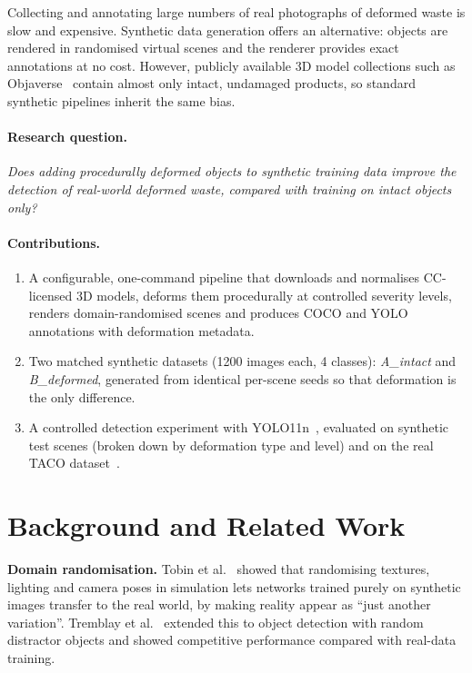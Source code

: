 \documentclass[11pt,a4paper]{article}
\begin{document}
Collecting and annotating large numbers of real photographs of deformed waste is slow and
expensive. Synthetic data generation offers an alternative: objects are rendered in randomised
virtual scenes and the renderer provides exact annotations at no cost. However, publicly
available 3D model collections such as Objaverse~\cite{objaverse} contain almost only intact,
undamaged products, so standard synthetic pipelines inherit the same bias.

\paragraph{Research question.} \emph{Does adding procedurally deformed objects to synthetic
training data improve the detection of real-world deformed waste, compared with training on
intact objects only?}

\paragraph{Contributions.}
\begin{enumerate}
  \item A configurable, one-command pipeline that downloads and normalises CC-licensed 3D models,
        deforms them procedurally at controlled severity levels, renders domain-randomised
        scenes and produces COCO and YOLO annotations with deformation metadata.
  \item Two matched synthetic datasets (1200 images each, 4 classes): \emph{A\_intact} and
        \emph{B\_deformed}, generated from identical per-scene seeds so that deformation is the
        only difference.
  \item A controlled detection experiment with YOLO11n~\cite{yolo11}, evaluated on synthetic test
        scenes (broken down by deformation type and level) and on the real TACO
        dataset~\cite{taco}.
\end{enumerate}

\section{Background and Related Work}

\textbf{Domain randomisation.} Tobin et al.~\cite{tobin} showed that randomising textures,
lighting and camera poses in simulation lets networks trained purely on synthetic images
transfer to the real world, by making reality appear as ``just another variation''. Tremblay
et al.~\cite{tremblay} extended this to object detection with random distractor objects and
showed competitive performance compared with real-data training.
\end{document}
